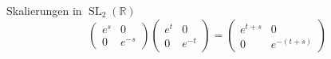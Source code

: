 \begin{frame}[t]
\begin{columns}[t,onlytextwidth]
\begin{column}{0.48\textwidth}
{\begin{block}{Skalierungen in $\operatorname{SL}_2(\mathbb{R})$}
\[\begin{pmatrix}
e^s&0\\0&e^{-s}
\end{pmatrix}
\begin{pmatrix}
e^t&0\\0&e^{-t}
\end{pmatrix}
=
\begin{pmatrix}
e^{t+s}&0\\0&e^{-(t+s)}
\end{pmatrix}
\]
\end{block}}
\vspace{-12pt}
\end{column}
\end{columns}
\end{frame}
\egroup
